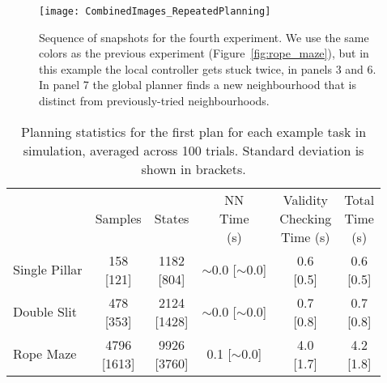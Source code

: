 \begin{figure}[h]
    \centering
    \texttt{[image: CombinedImages\_RepeatedPlanning]}
    \vspace{-2in}
    \caption{Sequence of snapshots for the fourth experiment. We use the same colors as the previous experiment (Figure~\ref{fig:rope_maze}), but in this example the local controller gets stuck twice, in panels 3 and 6. In panel 7 the global planner finds a new neighbourhood that is distinct from previously-tried neighbourhoods.}
    \label{fig:repeated_planning}
\end{figure}

\FloatBarrier

\begin{table}[h]
\centering
\caption{Planning statistics for the first plan for each example task in simulation, averaged across 100 trials. Standard deviation is shown in brackets.}
\label{tab:planning_statistics}
\begin{tabular}{lccccc}
\hline\noalign{\smallskip}
    & Samples & States & \makecell{NN\\Time\\(s)} & \makecell{Validity\\Checking\\Time (s)} & \makecell{Total\\Time\\(s)} \\
\noalign{\smallskip}\hline\noalign{\smallskip}
Single Pillar                    & \makecell{ 158 \\ {[121]}} & \makecell{1182 \\ {[804]}} & \makecell{$\sim$0.0 \\{[$\sim$0.0]}} & \makecell{0.6 \\{[0.5]}} & \makecell{0.6 \\{[0.5]}}\\
\noalign{\smallskip}
Double Slit                      & \makecell{ 478 \\ {[353]}} & \makecell{2124 \\{[1428]}} & \makecell{$\sim$0.0 \\{[$\sim$0.0]}} & \makecell{0.7 \\{[0.8]}} & \makecell{0.7 \\{[0.8]}}\\
\noalign{\smallskip}
Rope Maze                        & \makecell{4796 \\{[1613]}} & \makecell{9926 \\{[3760]}} & \makecell{      0.1 \\{[$\sim$0.0]}} & \makecell{4.0 \\{[1.7]}} & \makecell{4.2 \\{[1.8]}}\\

\end{tabular}
\end{table}
